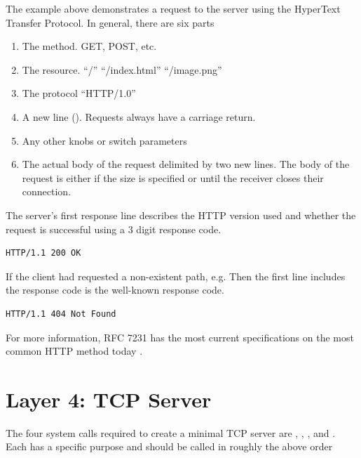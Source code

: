 The example above demonstrates a request to the server using the HyperText Transfer Protocol.
In general, there are six parts

\begin{enumerate}
\item The method. GET, POST, etc.
\item The resource. ``/'' ``/index.html'' ``/image.png''
\item The protocol ``HTTP/1.0''
\item A new line (\keyword{\\r\\n}). Requests always have a carriage return.
\item Any other knobs or switch parameters
\item The actual body of the request delimited by two new lines. The body of the request is either if the size is specified or until the receiver closes their connection.
\end{enumerate}

The server's first response line describes the HTTP version used and whether the request is successful using a 3 digit response code.

\begin{lstlisting}
HTTP/1.1 200 OK
\end{lstlisting}

If the client had requested a non-existent path, e.g.
 Then the first line includes the response code is the well-known  response code.

\begin{lstlisting}
HTTP/1.1 404 Not Found
\end{lstlisting}

For more information, RFC 7231 has the most current specifications on the most common HTTP method today \cite{rfc7231}.

\section{Layer 4: TCP Server}

The four system calls required to create a minimal TCP server are , , , and .
Each has a specific purpose and should be called in roughly the above order

